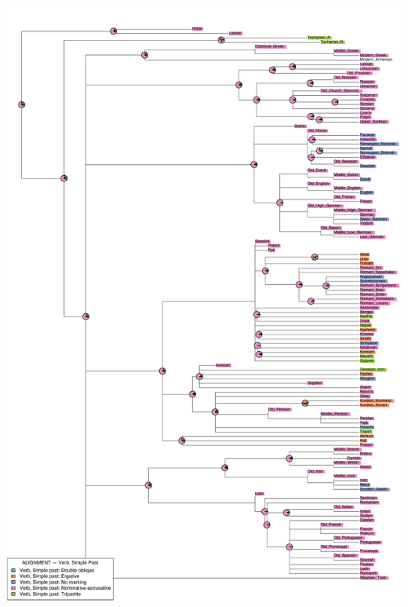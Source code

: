 \includegraphics[width=.9\linewidth]{supp-graphics/ALIGNMENTVerbSimplePastVPSTOSoALIGNMENTVerbSimplePastVPSTAOALIGNMENTVerbSimplePastVPSTASaALIGNMENTVerbSimplePastVPSTSaSo.pdf}

